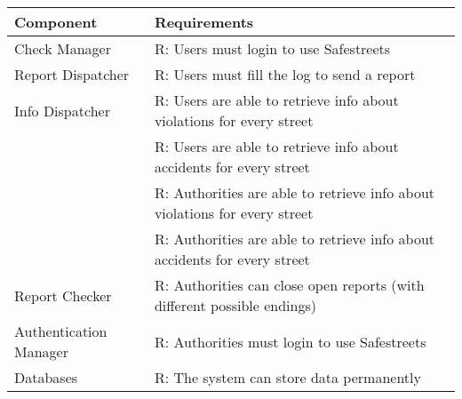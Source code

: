 \begin{tabular}{|l|l|}
	\hline    
    \textbf{Component} & \textbf{Requirements} \\ \hline

    Check Manager & R: Users must login to use Safestreets \\ \hline
    Report Dispatcher & R: Users must fill the log to send a report \\ \hline
    Info Dispatcher & R: Users are able to retrieve info about violations for every street \\ &
                            R: Users are able to retrieve info about accidents for every street \\ &
                            R: Authorities are able to retrieve info about violations for every street \\ &
                            R: Authorities are able to retrieve info about accidents for every street
                        \\ \hline
    Report Checker & R: Authorities can close open reports (with different possible endings)\\ \hline
    Authentication Manager & R: Authorities must login to use Safestreets\\ \hline
    Databases & R: The system can store data permanently \\ \hline
    
\end{tabular}